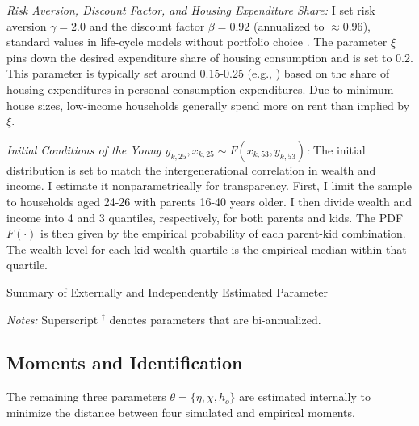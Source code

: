\documentclass[12pt]{article}
\begin{document}

\textit{Risk Aversion, Discount Factor, and Housing Expenditure Share:} I set risk aversion $\gamma=2.0$ and the discount factor $\beta=0.92$ (annualized to $\approx0.96$), standard values in life-cycle models without portfolio choice \citep[see e.g.,][]{Kaplan2020,Boar2018}. The parameter $\xi$ pins down the desired expenditure share of housing consumption and is set to 0.2. This parameter is typically set around 0.15-0.25 (e.g., \citealp{Kaplan2020,Chatterjee2015,Paz-Pardo2019,davis2011household}) based on the share of housing expenditures in personal consumption expenditures. Due to minimum house sizes, low-income households generally spend more on rent than implied by $\xi$.


\textit{Initial Conditions of the Young $y_{k,25},x_{k,25}\sim F(x_{k,53},y_{k,53})$:} 
The initial distribution is set to match the intergenerational correlation in wealth and income. I estimate it nonparametrically for transparency. First, I limit the sample to households aged 24-26 with parents 16-40 years older. I then divide wealth and income into 4 and 3 quantiles, respectively, for both parents and kids. The PDF $F(\cdot)$ is then given by the empirical probability of each parent-kid combination. The wealth level for each kid wealth quartile is the empirical median within that quartile.

 
\begin{table}
	\center
	\begin{threeparttable}
		\caption{Summary of Externally and Independently Estimated Parameter}\label{tab:calpar}
		\small
		
		\footnotesize
		\textit{Notes:} Superscript $^\dagger$ denotes parameters that are bi-annualized.
	\end{threeparttable}
\end{table}


\subsection{Moments and Identification}
The remaining three parameters $\theta=\{\eta,\chi,h_o\}$ are estimated internally to minimize the distance between four simulated and empirical moments. 
\end{document}
